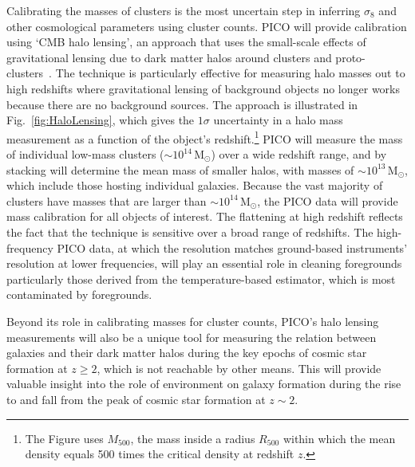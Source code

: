 \documentclass[PICOReport.tex]{subfiles}
\begin{document}
Calibrating the masses of clusters is the most uncertain step in inferring $\sigma_{8}$ and other cosmological parameters using cluster counts.  PICO will provide calibration using `CMB halo lensing', an approach that uses the small-scale effects of gravitational lensing due to dark matter halos around clusters and proto-clusters~\citep{2015ApJ...806..247B, 2015PhRvL.114o1302M, 2016A&A...594A..24P}. The technique is particularly effective for measuring halo masses out to high redshifts where gravitational lensing of background objects no longer works because there are no background sources. 
The approach is illustrated in Fig.~\ref{fig:HaloLensing}, which gives the $1\sigma$ uncertainty in a halo mass measurement as a function of the object's redshift.\footnote{The Figure uses $M_{500}$, the mass inside a radius $R_{500}$ within which the mean density equals 500 times the critical density at redshift $z$.} PICO will measure the mass of individual low-mass clusters ($\sim 10^{14}$\,M$_\odot$) over a wide redshift range, and by stacking will determine the mean mass of smaller halos, with masses of $\sim 10^{13}$\,M$_\odot$, which include those hosting individual galaxies. Because the vast majority of clusters have masses that are larger than $\sim 10^{14}$\,M$_\odot$, the PICO data will provide mass calibration for all objects of interest. The flattening at high redshift reflects the fact that the technique is sensitive over a broad range of redshifts. The high-frequency PICO data, at which the resolution matches ground-based instruments' resolution at lower frequencies, will play an essential role in cleaning foregrounds particularly those derived from the temperature-based estimator, which is most contaminated by foregrounds. 

Beyond its role in calibrating masses for cluster counts, PICO's halo lensing measurements will also be a unique tool for measuring the relation between galaxies and their dark matter halos during the key epochs of cosmic star formation at $z\geq 2$, which is not reachable by other means.  This will provide valuable insight into the role of environment on galaxy formation during the rise to and fall from the peak of cosmic star formation at $z\sim 2$. 


\end{document}
